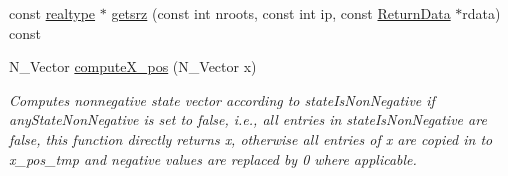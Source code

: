 \begin{DoxyCompactItemize}
\item 
const \mbox{\hyperlink{namespaceamici_a1bdce28051d6a53868f7ccbf5f2c14a3}{realtype}} $\ast$ \mbox{\hyperlink{classamici_1_1_model_a49336e5923942fc5b4b26d6facf90b1d}{getsrz}} (const int nroots, const int ip, const \mbox{\hyperlink{classamici_1_1_return_data}{Return\+Data}} $\ast$rdata) const
\item 
N\+\_\+\+Vector \mbox{\hyperlink{classamici_1_1_model_a0c06c5326bb82ceedba30171c122cb8a}{compute\+X\+\_\+pos}} (N\+\_\+\+Vector x)
\begin{DoxyCompactList}\small\item\em Computes nonnegative state vector according to state\+Is\+Non\+Negative if any\+State\+Non\+Negative is set to false, i.\+e., all entries in state\+Is\+Non\+Negative are false, this function directly returns x, otherwise all entries of x are copied in to x\+\_\+pos\+\_\+tmp and negative values are replaced by 0 where applicable. \end{DoxyCompactList}\end{DoxyCompactItemize}

